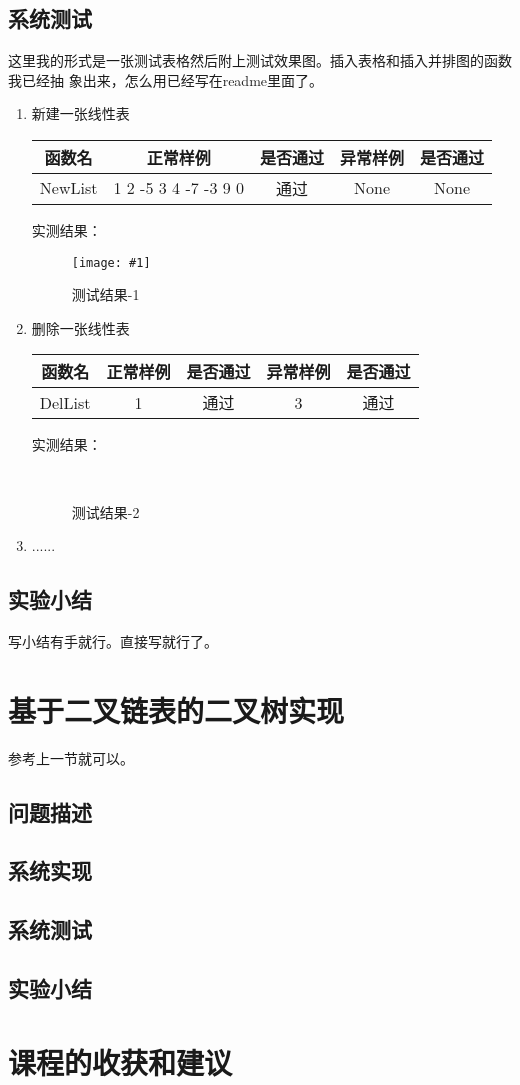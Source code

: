 \documentclass[supercite]{Experimental_Report}
\newcommand{\TestTable}[5]{
	\begin{table}[H]
		\centering
		\begin{tabular}{|c|c|c|c|c|}
			\hline
			函数名    & 正常样例 & 是否通过 & 异常样例 & 是否通过 \\ \hline
			#1 & #2   & #3    & #4    & #5   \\ \hline
		\end{tabular}
	\end{table}
}
\newcommand{\InsertSingleFigure}[3]{
	\begin{figure}[H]
		\centering
		\texttt{[image: \#1]}
		\caption{#3}
	\end{figure}
}
\newcommand{\InsertDoubleFigure}[3]{
	\begin{figure}[H]
		\centering
		\subfloat[正常样例]{
			\texttt{[image: \#1]}}
		\\
		\subfloat[异常样例]{
			\texttt{[image: \#2]}}
		\caption{测试结果-#3}
	\end{figure}
}
\theoremstyle{definition}
\begin{document}
\subsection{系统测试}
	这里我的形式是一张测试表格然后附上测试效果图。插入表格和插入并排图的函数我已经抽
	象出来，怎么用已经写在readme里面了。
	\begin{enumerate}
		\item 新建一张线性表\par
		\TestTable{NewList}{1 2 -5 3 4 -7 -3 9 0}
		{通过}{None}{None}
		实测结果：
		\InsertSingleFigure{images/链表测试结果/测试1-1}{0.5}{测试结果-1}
		\item 删除一张线性表\par
		\TestTable{DelList}{1}{通过}{3}{通过}
		实测结果：
		\InsertDoubleFigure{images/链表测试结果/测试2-1}
		{images/链表测试结果/测试2-2}{2}
		\item ......
	\end{enumerate}

\subsection{实验小结}
    写小结有手就行。直接写就行了。

\newpage

\section{基于二叉链表的二叉树实现}
参考上一节就可以。
\subsection{问题描述}

\subsection{系统实现}

\subsection{系统测试}

\subsection{实验小结}


\newpage

\section{课程的收获和建议}
\end{document}
